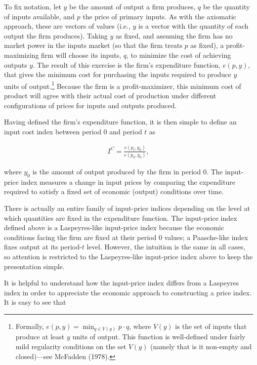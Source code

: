 \documentclass[]{article}
\begin{document}
To fix notation, let \(y\) be the amount of output a firm produces, \(q\) be the quantity of inputs available, and \(p\) the price of primary inputs. As with the axiomatic approach, these are vectors of values (i.e., \(y\) is a vector with the quantity of each output the firm produces). Taking \(y\) as fixed, and assuming the firm has no market power in the inputs market (so that the firm treats \(p\) as fixed), a profit-maximizing firm will choose its inputs, \(q\), to minimize the cost of achieving outputs \(y\). The result of this exercise is the firm's expenditure function, \(e(p, y)\), that gives the minimum cost for purchasing the inputs required to produce \(y\) units of output.\footnote{Formally, \(e(p, y) = \min_{q \in V(y)} p \cdot q\), where \(V(y)\) is the set of inputs that produce at least \(y\) units of output. This function is well-defined under fairly mild regularity conditions on the set \(V(y)\) (namely that is it non-empty and closed)---see McFadden (1978).} Because the firm is a profit-maximizer, this minimum cost of product will agree with their actual cost of production under different configurations of prices for inputs and outputs produced.

Having defined the firm's expenditure function, it is then simple to define an input cost index between period 0 and period \(t\) as

\begin{align*}
I^{C} = \frac{e(p_{t}, y_{0})}{e(p_{0}, y_{0})},
\end{align*}

where \(y_{0}\) is the amount of output produced by the firm in period 0. The input-price index measures a change in input prices by comparing the expenditure required to satisfy a fixed set of economic (output) conditions over time.

There is actually an entire family of input-price indices depending on the level at which quantities are fixed in the expenditure function. The input-price index defined above is a Laspeyres-like input-price index because the economic conditions facing the firm are fixed at their period 0 values; a Paasche-like index fixes output at its period-\(t\) level. However, the intuition is the same in all cases, so attention is restricted to the Laspeyres-like input-price index above to keep the presentation simple.

It is helpful to understand how the input-price index differs from a Laspeyres index in order to appreciate the economic approach to constructing a price index. It is easy to see that
\end{document}
